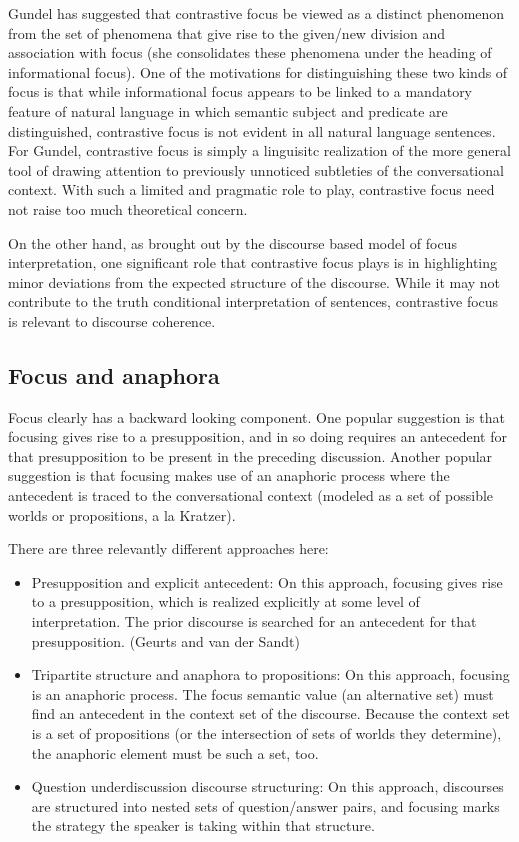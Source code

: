 \documentclass[10pt]{article}
\begin{document}
Gundel has suggested that contrastive focus be viewed as a distinct phenomenon from the set of phenomena that give rise to the given/new division and association with focus (she consolidates these phenomena under the heading of informational focus).  One of the motivations for distinguishing these two kinds of focus is that while informational focus appears to be linked to a mandatory feature of natural language in which semantic subject and predicate are distinguished, contrastive focus is not evident in all natural language sentences.  For Gundel, contrastive focus is simply a linguisitc realization of the more general tool of drawing attention to previously unnoticed subtleties of the conversational context.  With such a limited and pragmatic role to play, contrastive focus need not raise too much theoretical concern.

On the other hand, as brought out by the discourse based model of focus interpretation, one significant role that contrastive focus plays is in highlighting minor deviations from the expected structure of the discourse.  While it may not contribute to the truth conditional interpretation of sentences, contrastive focus is relevant to discourse coherence.  

\subsection{Focus and anaphora}

Focus clearly has a backward looking component.  One popular suggestion is that focusing gives rise to a presupposition, and in so doing requires an antecedent for that presupposition to be present in the preceding discussion.  Another popular suggestion is that focusing makes use of an anaphoric process where the antecedent is traced to the conversational context (modeled as a set of possible worlds or propositions, a la Kratzer).

There are three relevantly different approaches here:
\begin{itemize}
 \item Presupposition and explicit antecedent:  On this approach, focusing gives rise to a presupposition, which is realized explicitly at some level of interpretation.  The prior discourse is searched for an antecedent for that presupposition. (Geurts and van der Sandt)
 \item Tripartite structure and anaphora to propositions: On this approach, focusing is an anaphoric process.  The focus semantic value (an alternative set) must find an antecedent in the context set of the discourse.  Because the context set is a set of propositions (or the intersection of sets of worlds they determine), the anaphoric element must be such a set, too.
 \item Question underdiscussion discourse structuring:  On this approach, discourses are structured into nested sets of question/answer pairs, and focusing marks the strategy the speaker is taking within that structure.
\end{itemize}
\end{document}
